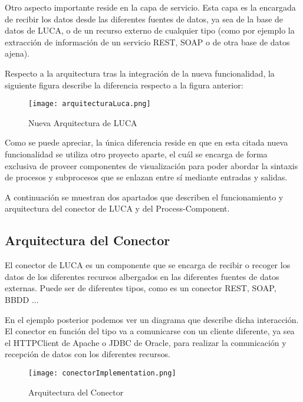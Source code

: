 Otro aspecto importante reside en la capa de servicio. Esta capa es la encargada de recibir los datos desde las diferentes fuentes de datos, ya sea de la base de datos de LUCA, o de un recurso externo de cualquier tipo (como por ejemplo la extracción de  información de un servicio REST, SOAP o de otra base de datos ajena).

\vspace{5mm}

Respecto a la arquitectura tras la integración de la nueva funcionalidad, la siguiente figura describe la diferencia respecto a la figura anterior:

\begin{figure}[H]
	\centering
	\texttt{[image: arquitecturaLuca.png]}
	\caption{Nueva Arquitectura de LUCA}\label{fig:arquitecturaLuca}
\end{figure}

Como se puede apreciar, la única diferencia reside en que en esta citada nueva funcionalidad se utiliza otro proyecto aparte, el cuál se encarga de forma exclusiva de proveer componentes de visualización para poder abordar la sintaxis de procesos y subprocesos que se enlazan entre sí mediante entradas y salidas.

\vspace{5mm}

A continuación se muestran dos apartados que describen el funcionamiento y arquitectura del conector de LUCA y del Process-Component.

\subsection{Arquitectura del Conector}


El conector de LUCA es un componente que se encarga de recibir o recoger los datos de los diferentes recursos albergados en las diferentes fuentes de datos externas. Puede ser de diferentes tipos, como es un conector REST, SOAP, BBDD ... 

\vspace{5mm}

En el ejemplo posterior podemos ver un diagrama que describe dicha interacción. El conector en función del tipo va a comunicarse con un cliente diferente, ya sea el HTTPClient \cite{httpclient} de Apache o JDBC \cite{jdbc} de Oracle, para realizar la comunicación y recepción de datos con los diferentes recursos.

\begin{figure}[H]
	\centering
	\texttt{[image: conectorImplementation.png]}
	\caption{Arquitectura del Conector}\label{fig:conectorImplementation}
\end{figure}

